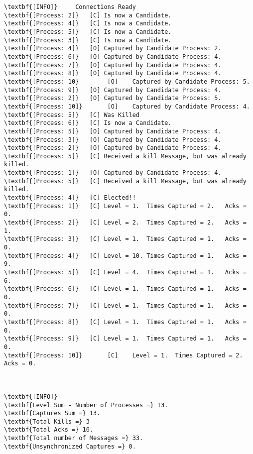 	\begin{Verbatim}[commandchars=\\\{\},codes={\catcode`$=3\catcode`_=8},frame=single,label=Test 4 output]
\textbf{[INFO]}	  	Connections Ready
\textbf{[Process: 2]}	[C]	Is now a Candidate.
\textbf{[Process: 4]}	[C]	Is now a Candidate.
\textbf{[Process: 5]}	[C]	Is now a Candidate.
\textbf{[Process: 3]}	[C]	Is now a Candidate.
\textbf{[Process: 4]}	[O]	Captured by Candidate Process: 2.
\textbf{[Process: 6]}	[O]	Captured by Candidate Process: 4.
\textbf{[Process: 7]}	[O]	Captured by Candidate Process: 4.
\textbf{[Process: 8]}	[O]	Captured by Candidate Process: 4.
\textbf{[Process: 10}        [O]	Captured by Candidate Process: 5.
\textbf{[Process: 9]}	[O]	Captured by Candidate Process: 4.
\textbf{[Process: 2]}	[O]	Captured by Candidate Process: 5.
\textbf{[Process: 10]}       [O]	Captured by Candidate Process: 4.
\textbf{[Process: 5]}	[C]	Was Killed
\textbf{[Process: 6]}	[C]	Is now a Candidate.
\textbf{[Process: 5]}	[O]	Captured by Candidate Process: 4.
\textbf{[Process: 3]}	[O]	Captured by Candidate Process: 4.
\textbf{[Process: 2]}	[O]	Captured by Candidate Process: 4.
\textbf{[Process: 5]}	[C]	Received a kill Message, but was already killed.
\textbf{[Process: 1]}	[O]	Captured by Candidate Process: 4.
\textbf{[Process: 5]}	[C]	Received a kill Message, but was already killed.
\textbf{[Process: 4]}	[C]	Elected!! 
\textbf{[Process: 1]}	[C]	Level = 1.  Times Captured = 2.   Acks = 0.
\textbf{[Process: 2]}	[C]	Level = 2.  Times Captured = 2.   Acks = 1.
\textbf{[Process: 3]}	[C]	Level = 1.  Times Captured = 1.   Acks = 0.
\textbf{[Process: 4]}	[C]	Level = 10. Times Captured = 1.   Acks = 9.
\textbf{[Process: 5]}	[C]	Level = 4.  Times Captured = 1.   Acks = 6.
\textbf{[Process: 6]}	[C]	Level = 1.  Times Captured = 1.   Acks = 0.
\textbf{[Process: 7]}	[C]	Level = 1.  Times Captured = 1.   Acks = 0.
\textbf{[Process: 8]}	[C]	Level = 1.  Times Captured = 1.   Acks = 0.
\textbf{[Process: 9]}	[C]	Level = 1.  Times Captured = 1.   Acks = 0.
\textbf{[Process: 10]}       [C]	Level = 1.  Times Captured = 2.   Acks = 0.



\textbf{[INFO]}			
\textbf{Level Sum - Number of Processes =} 13.	
\textbf{Captures Sum =} 13.	
\textbf{Total Kills =} 3	
\textbf{Total Acks =} 16.
\textbf{Total number of Messages =} 33.
\textbf{Unsynchronized Captures =} 0.
	\end{Verbatim}

	\vspace{10pt}

